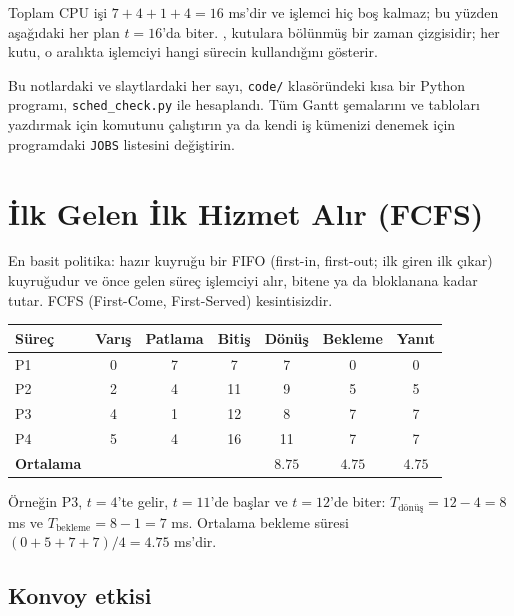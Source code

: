 Toplam CPU işi $7+4+1+4=16$ ms'dir ve işlemci hiç boş kalmaz; bu yüzden aşağıdaki her plan $t=16$'da biter. , kutulara bölünmüş bir zaman çizgisidir; her kutu, o aralıkta işlemciyi hangi sürecin kullandığını gösterir.

Bu notlardaki ve slaytlardaki her sayı, \texttt{code/} klasöründeki kısa bir Python programı, \texttt{sched\_check.py} ile hesaplandı. Tüm Gantt şemalarını ve tabloları yazdırmak için  komutunu çalıştırın ya da kendi iş kümenizi denemek için programdaki \texttt{JOBS} listesini değiştirin.

\section{İlk Gelen İlk Hizmet Alır (FCFS)}

En basit politika: hazır kuyruğu bir FIFO (first-in, first-out; ilk giren ilk çıkar) kuyruğudur ve önce gelen süreç işlemciyi alır, bitene ya da bloklanana kadar tutar. FCFS (First-Come, First-Served) kesintisizdir.

\begin{center}
\end{center}

\begin{center}
\renewcommand{\arraystretch}{1.2}
\begin{tabular}{@{}lcccccc@{}}
\toprule
\textbf{Süreç} & \textbf{Varış} & \textbf{Patlama} & \textbf{Bitiş} & \textbf{Dönüş} & \textbf{Bekleme} & \textbf{Yanıt}\\
\midrule
P1 & 0 & 7 & 7 & 7 & 0 & 0\\
P2 & 2 & 4 & 11 & 9 & 5 & 5\\
P3 & 4 & 1 & 12 & 8 & 7 & 7\\
P4 & 5 & 4 & 16 & 11 & 7 & 7\\
\midrule
\textbf{Ortalama} & & & & $8.75$ & $4.75$ & $4.75$\\
\bottomrule
\end{tabular}
\end{center}

Örneğin P3, $t=4$'te gelir, $t=11$'de başlar ve $t=12$'de biter: $T_{\text{dönüş}} = 12-4 = 8$ ms ve $T_{\text{bekleme}} = 8-1 = 7$ ms. Ortalama bekleme süresi $(0+5+7+7)/4 = 4.75$ ms'dir.

\subsection{Konvoy etkisi}

